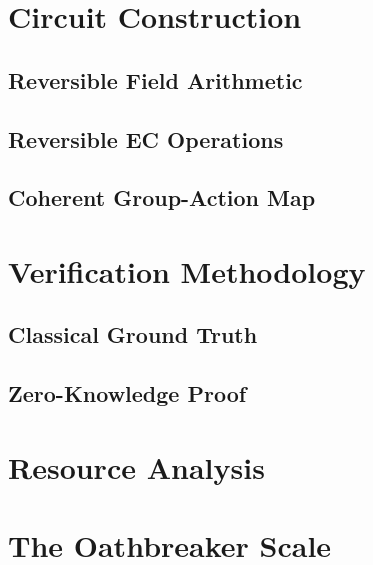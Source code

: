 \documentclass[11pt]{article}
\begin{document}

\section{Circuit Construction}

\subsection{Reversible Field Arithmetic}

\subsection{Reversible EC Operations}

\subsection{Coherent Group-Action Map}

\section{Verification Methodology}

\subsection{Classical Ground Truth}

\subsection{Zero-Knowledge Proof}

\section{Resource Analysis}


\section{The Oathbreaker Scale}

\end{document}
